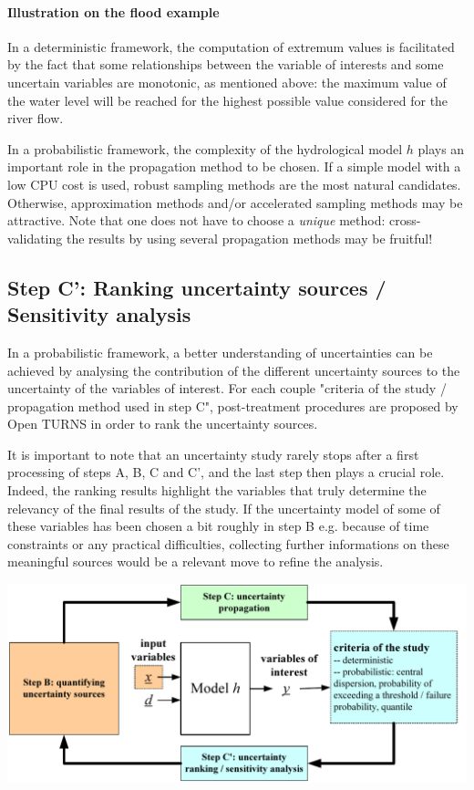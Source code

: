 \paragraph{Illustration on the flood example}
\par

In a deterministic framework, the computation of extremum values is facilitated by the fact that some relationships between the variable of interests and some uncertain variables are monotonic, as mentioned above: the maximum value of the water level will be reached for the highest possible value considered for the river flow.

In a probabilistic framework, the complexity of the hydrological model $h$ plays an important role in the propagation method to be chosen. If a simple model with a low CPU cost is used, robust sampling methods are the most natural candidates. Otherwise, approximation methods and/or accelerated sampling methods may be attractive. Note that one does not have to choose a {\em unique} method: cross-validating the results by using several propagation methods may be fruitful!

\subsection{Step C': Ranking uncertainty sources / Sensitivity analysis}

In a probabilistic framework, a better understanding of uncertainties can be achieved by analysing the contribution of the different uncertainty sources to the uncertainty of the variables of interest. For each couple "criteria of the study / propagation method used in step C", post-treatment procedures are proposed by Open TURNS in order to rank the uncertainty sources.

It is important to note that an uncertainty study rarely stops after a first processing of steps A, B, C and C', and the last step then plays a crucial role. Indeed, the ranking results highlight the variables that truly determine the relevancy of the final results of the study. If the uncertainty model of some of these variables has been chosen a bit roughly in step B e.g. because of time constraints or any practical difficulties, collecting further informations on these meaningful sources would be a relevant move to refine the analysis.

\begin{center}
  \includegraphics[scale=0.8]{flow5.pdf}
\end{center}

